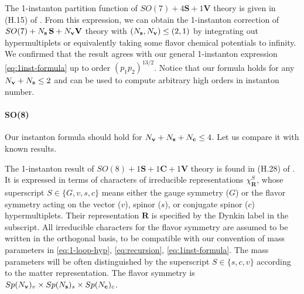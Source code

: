 \documentclass[letterpaper, 11pt]{article}
\begin{document}
{The 1-instanton partition function of $SO(7) + 4\mathbf{S} + 1\mathbf{V}$ theory is given in (H.15) of \cite{DelZotto:2018tcj}.
From this expression, we can obtain the 1-instanton correction of $SO(7) + N_{\bf s}\,\mathbf{S} + N_{\bf v}\mathbf{V}$ theory with $( N_{\bf s}, N_{\bf v}) \leq ( 2,1)$ by integrating out hypermultiplets or equivalently taking some flavor chemical potentials to infinity. We confirmed that the result agrees with our general 1-instanton expression \eqref{eq:1inst-formula} up to order $(p_1p_2)^{13/2}$. Notice that our formula holds for any $N_{\bf v} + N_{\bf s} \le 2$ and can be used to compute arbitrary high orders in instanton number. 

\paragraph{SO(8)}
Our instanton formula should hold for $N_{\bf v} + N_{\bf s} + N_{\bf c} \le 4$. Let us compare it with known results. 

The 1-instanton result of $SO(8) + 1\mathbf{S} + 1\mathbf{C} + 1\mathbf{V}$ theory is found in (H.28) of \cite{DelZotto:2018tcj}.
It is expressed in terms of characters of irreducible representations $\chi_{\mathbf{R}}^S$, whose superscript $S \in \{G,v,s,c\}$ means either the gauge symmetry ($G$) or the flavor symmetry acting on the vector ($v$), spinor ($s$), or conjugate spinor ($c$) hypermultiplets. Their representation $\mathbf{R}$ is specified by the Dynkin label in the subscript. All irreducible characters for the flavor symmetry are assumed to be written in the orthogonal basis, to be compatible with our convention of mass parameters in \eqref{eq:1-loop-hyp}, \eqref{eq:recursion}, \eqref{eq:1inst-formula}. The mass parameters will be often distinguished by the superscript $S \in \{s,c,v\}$ according to the matter representation. The flavor symmetry is $Sp(N_{\bf v})_v \times Sp(N_{\bf s})_s \times Sp(N_{\bf c})_c$.

}
\end{document}
